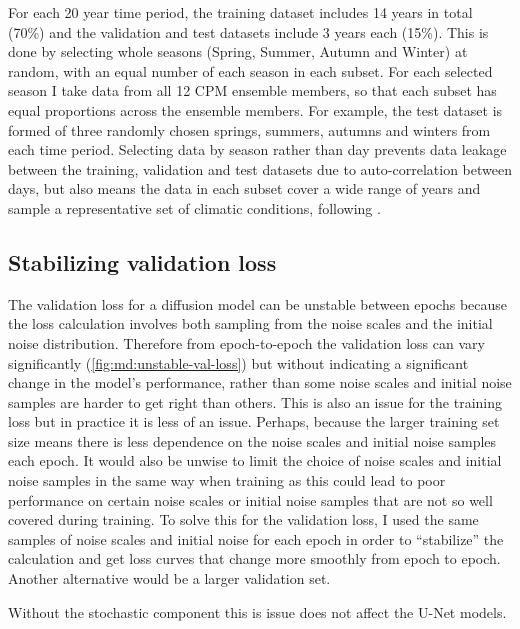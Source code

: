 For each 20 year time period, the training dataset includes 14 years in total (70\%) and the validation and test datasets include 3 years each (15\%). This is done by selecting whole seasons (Spring, Summer, Autumn and Winter) at random, with an equal number of each season in each subset. For each selected season I take data from all 12 CPM ensemble members, so that each subset has equal proportions across the ensemble members. For example, the test dataset is formed of three randomly chosen springs, summers, autumns and winters from each time period. Selecting data by season rather than day prevents data leakage between the training, validation and test datasets due to auto-correlation between days, but also means the data in each subset cover a wide range of years and sample a representative set of climatic conditions, following \textcite{schulz2021dlvsnumweather}.

\subsection{Stabilizing validation loss}

The validation loss for a diffusion model can be unstable between epochs because the loss calculation involves both sampling from the noise scales and the initial noise distribution.
Therefore from epoch-to-epoch the validation loss can vary significantly (\autoref{fig:md:unstable-val-loss}) but without indicating a significant change in the model's performance, rather than some noise scales and initial noise samples are harder to get right than others.
This is also an issue for the training loss but in practice it is less of an issue.
Perhaps, because the larger training set size means there is less dependence on the noise scales and initial noise samples each epoch.
It would also be unwise to limit the choice of noise scales and initial noise samples in the same way when training as this could lead to poor performance on certain noise scales or initial noise samples that are not so well covered during training.
To solve this for the validation loss, I used the same samples of noise scales and initial noise for each epoch in order to ``stabilize'' the calculation and get loss curves that change more smoothly from epoch to epoch.
Another alternative would be a larger validation set.

Without the stochastic component this is issue does not affect the U-Net models.

